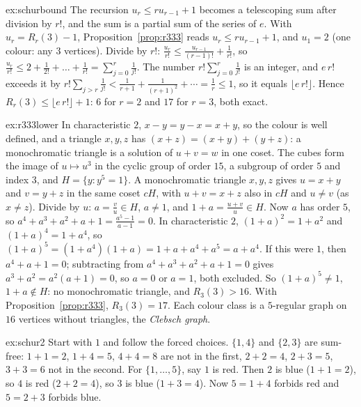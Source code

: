 \begin{solution}{ex:schurbound}
\idea The recursion $u_r\le ru_{r-1}+1$ becomes a telescoping sum after division by $r!$, and the sum is a partial sum of the series of $e$.
\writeup With $u_r=R_r(3)-1$, Proposition~\ref{prop:r333} reads $u_r\le ru_{r-1}+1$, and $u_1=2$ (one colour: any $3$ vertices). Divide by $r!$: $\frac{u_r}{r!}\le\frac{u_{r-1}}{(r-1)!}+\frac1{r!}$, so
$\frac{u_r}{r!}\le2+\frac1{2!}+\dots+\frac1{r!}=\sum_{j=0}^r\frac1{j!}$. The number $r!\sum_{j=0}^r\frac1{j!}$ is an integer, and $e\,r!$ exceeds it by $r!\sum_{j>r}\frac1{j!}<\frac1{r+1}+\frac1{(r+1)^2}+\cdots=\frac1r\le1$, so it equals
$\lfloor e\,r!\rfloor$. Hence $R_r(3)\le\lfloor e\,r!\rfloor+1$: $6$ for $r=2$ and $17$ for $r=3$, both exact.
\end{solution}

\begin{solution}{ex:r333lower}
\idea In characteristic $2$, $x-y=y-x=x+y$, so the colour is well defined, and a triangle $x,y,z$ has $(x+z)=(x+y)+(y+z)$: a monochromatic triangle is a solution of $u+v=w$ in one coset.
\writeup The cubes form the image of $u\mapsto u^3$ in the cyclic group of order $15$, a subgroup of order $5$ and index $3$, and $H=\{y:y^5=1\}$. A monochromatic triangle $x,y,z$ gives $u=x+y$ and
$v=y+z$ in the same coset $cH$, with $u+v=x+z$ also in $cH$ and $u\ne v$ (as $x\ne z$). Divide by $u$: $a=\frac vu\in H$, $a\ne1$, and $1+a=\frac{u+v}u\in H$. Now $a$ has order $5$, so
$a^4+a^3+a^2+a+1=\frac{a^5-1}{a-1}=0$. In characteristic $2$, $(1+a)^2=1+a^2$ and $(1+a)^4=1+a^4$, so $(1+a)^5=(1+a^4)(1+a)=1+a+a^4+a^5=a+a^4$. If this were $1$, then $a^4+a+1=0$; subtracting from
$a^4+a^3+a^2+a+1=0$ gives $a^3+a^2=a^2(a+1)=0$, so $a=0$ or $a=1$, both excluded. So $(1+a)^5\ne1$, $1+a\notin H$: no monochromatic triangle, and $R_3(3)>16$. With Proposition~\ref{prop:r333},
$R_3(3)=17$. Each colour class is a $5$-regular graph on $16$ vertices without triangles, the \emph{Clebsch graph}.
\end{solution}

\begin{solution}{ex:schur2}
\idea Start with $1$ and follow the forced choices.
\writeup $\{1,4\}$ and $\{2,3\}$ are sum-free: $1+1=2$, $1+4=5$, $4+4=8$ are not in the first, $2+2=4$, $2+3=5$, $3+3=6$ not in the second. For $\{1,\dots,5\}$, say $1$ is red. Then $2$ is blue
($1+1=2$), so $4$ is red ($2+2=4$), so $3$ is blue ($1+3=4$). Now $5=1+4$ forbids red and $5=2+3$ forbids blue.
\end{solution}

